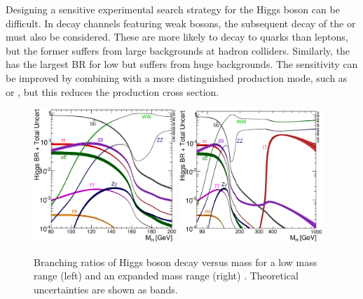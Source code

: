 Designing a sensitive experimental search strategy for the Higgs boson can be difficult. 
In decay channels featuring weak bosons, the subsequent decay of the \PW or \PZ must also 
be considered. These are more likely to decay to quarks than leptons, but the former 
suffers from large backgrounds at hadron colliders. Similarly, the 
\HepProcess{\Pbottom \APbottom} has the largest \ac{BR} for low \mH but suffers from huge 
backgrounds. The sensitivity can be improved by combining with a more distinguished 
production mode, such as \WH or \ZH, but this reduces the production cross section.

\begin{figure}
	\includegraphics[width=0.48\textwidth]{tex/motivation/BR_lowrange}
	\hfill
	\includegraphics[width=0.48\textwidth]{tex/motivation/BR_fullrange}
	\caption{Branching ratios of Higgs boson decay versus mass for a low mass range (left) 
	and an expanded mass range (right) \cite{YR3}. Theoretical uncertainties are shown as 
	bands.}
	\label{fig:higgs_br}
\end{figure}
